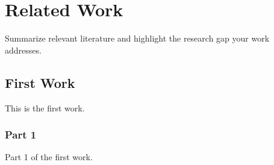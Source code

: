 \section{Related Work}
Summarize relevant literature and highlight the research gap your work addresses.

\subsection{First Work}
This is the first work.

\subsubsection{Part 1}
Part 1 of the first work.
